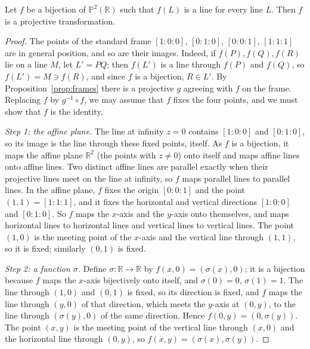 \begin{theorem}\label{thm:fundamental}
Let $f$ be a bijection of $\mathbb P^2(\mathbb R)$ such that $f(L)$ is a line for every line $L$. Then $f$ is a projective transformation.
\end{theorem}

\begin{proof}
The points of the standard frame $[1:0:0]$, $[0:1:0]$, $[0:0:1]$, $[1:1:1]$ are in general position, and so are their images. Indeed, if
$f(P),f(Q),f(R)$ lie on a line $M$, let $L'=PQ$; then $f(L')$ is a line through $f(P)$ and $f(Q)$, so $f(L')=M\ni f(R)$, and since $f$ is a
bijection, $R\in L'$. By Proposition~\ref{prop:frames} there is a
projective $g$ agreeing with $f$ on the frame. Replacing $f$ by $g^{-1}\circ f$, we may assume that $f$ fixes the four points, and we must show
that $f$ is the identity.

\emph{Step 1: the affine plane.} The line at infinity $z=0$ contains $[1:0:0]$ and $[0:1:0]$, so its image is the line through these fixed points,
itself. As $f$ is a bijection, it maps the affine plane $\mathbb R^2$ (the points with $z\ne0$) onto itself and maps affine lines onto affine lines.
Two distinct affine lines are parallel exactly when their projective lines meet on the line at infinity, so $f$ maps parallel lines to parallel
lines. In the affine plane, $f$ fixes the origin $[0:0:1]$ and the point $(1,1)=[1:1:1]$, and it fixes the horizontal and vertical directions
$[1:0:0]$ and $[0:1:0]$. So $f$ maps the $x$-axis and the $y$-axis onto themselves, and maps horizontal lines to horizontal lines and vertical lines
to vertical lines. The point $(1,0)$ is the meeting point of the $x$-axis and the vertical line through $(1,1)$, so it is fixed; similarly
$(0,1)$ is fixed.

\emph{Step 2: a function $\sigma$.} Define $\sigma:\mathbb R\to\mathbb R$ by $f(x,0)=(\sigma(x),0)$; it is a bijection because $f$ maps the
$x$-axis bijectively onto itself, and $\sigma(0)=0$, $\sigma(1)=1$. The line through $(1,0)$ and $(0,1)$ is fixed, so its direction is fixed, and
$f$ maps the line through $(y,0)$ of that direction, which meets the $y$-axis at $(0,y)$, to the line through $(\sigma(y),0)$ of the same direction.
Hence $f(0,y)=(0,\sigma(y))$. The point $(x,y)$ is the meeting point of the vertical line through $(x,0)$ and the horizontal line through $(0,y)$,
so $f(x,y)=(\sigma(x),\sigma(y))$.


\end{proof}
